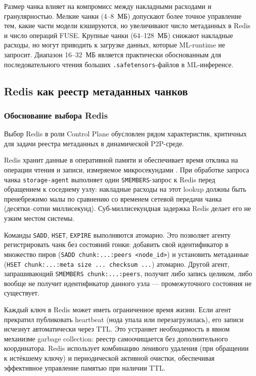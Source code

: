 Размер чанка влияет на компромисс между накладными расходами и гранулярностью. Мелкие чанки (4--8~МБ) допускают более точное управление тем, какие части модели кэшируются, но увеличивают число метаданных в Redis и число операций FUSE. Крупные чанки (64--128~МБ) снижают накладные расходы, но могут приводить к загрузке данных, которые ML-runtime не запросит. Диапазон 16--32~МБ является практически обоснованным для последовательного чтения больших \texttt{.safetensors}-файлов в ML-инференсе.

\subsection{Redis как реестр метаданных чанков}

\subsubsection{Обоснование выбора Redis}

Выбор Redis в роли Control Plane обусловлен рядом характеристик, критичных для задачи реестра метаданных в динамической P2P-среде.

 Redis хранит данные в оперативной памяти и обеспечивает время отклика на операции чтения и записи, измеряемое микросекундами \cite{redis_cluster_docs}. При обработке запроса чанка \texttt{storage-agent} выполняет один \texttt{SMEMBERS}-запрос к Redis перед обращением к соседнему узлу: накладные расходы на этот lookup должны быть пренебрежимо малы по сравнению со временем сетевой передачи чанка (десятки--сотни миллисекунд). Суб-миллисекундная задержка Redis делает его не узким местом системы.

 Команды \texttt{SADD}, \texttt{HSET}, \texttt{EXPIRE} выполняются атомарно. Это позволяет агенту регистрировать чанк без состояний гонки: добавить свой идентификатор в множество пиров (\texttt{SADD chunk:...:peers <node\_id>}) и установить метаданные (\texttt{HSET chunk:...:meta size ... checksum ...}) атомарно. Другой агент, запрашивающий \texttt{SMEMBERS chunk:...:peers}, получит либо запись целиком, либо вообще не получит идентификатор данного узла --- промежуточного состояния не существует.

 Каждый ключ в Redis может иметь ограниченное время жизни. Если агент прекратил публиковать heartbeat (нода упала или перезагрузилась), его записи исчезнут автоматически через TTL. Это устраняет необходимость в явном механизме garbage collection: реестр самоочищается без дополнительного координатора. Redis использует комбинацию ленивого удаления (при обращении к истёкшему ключу) и периодической активной очистки, обеспечивая эффективное управление памятью при наличии TTL.

